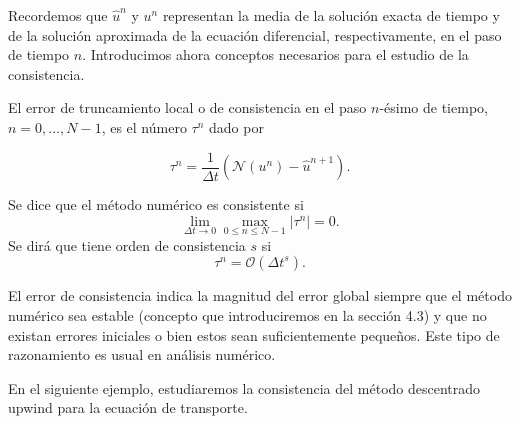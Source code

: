 Recordemos que $\widehat{u}^{n}$ y $u^{n}$ representan la media de la
solución exacta de tiempo y de la solución aproximada de la ecuación diferencial,
respectivamente, en el paso de tiempo $n$.
Introducimos ahora conceptos necesarios para el estudio de la consistencia.

\begin{definition}
  El error de truncamiento local o de consistencia en el paso
  $n$-ésimo de tiempo, $n=0,\dotsc,N-1$, es el número $\tau^{n}$ dado
  por

  \begin{equation*}
    \tau^{n}=
    \frac{1}{\Delta t}
    \left(
    \mathcal{N}\left(u^{n}\right)-
    \widehat{u}^{n+1}
    \right).
  \end{equation*}
\end{definition}

\begin{definition}
  Se dice que el método numérico es consistente si
  \begin{equation*}
    \lim_{\Delta t\to0}
    \max_{0\leq n\leq N-1}
    \left|\tau^{n}\right|
    =0.
  \end{equation*}
  Se dirá que tiene orden de consistencia $s$ si
  \begin{equation*}
    \tau^{n}=
    \mathcal{O}
    \left({\Delta t}^{s}\right).
  \end{equation*}
\end{definition}

\begin{remark}
  El error de consistencia indica la magnitud del error global
  siempre que el método numérico sea estable
  (concepto que introduciremos en la sección 4.3) y que no existan
  errores iniciales o bien estos sean suficientemente pequeños.
  Este tipo de razonamiento es usual en análisis numérico.
\end{remark}

En el siguiente ejemplo, estudiaremos la consistencia del método
descentrado upwind para la ecuación de transporte.

